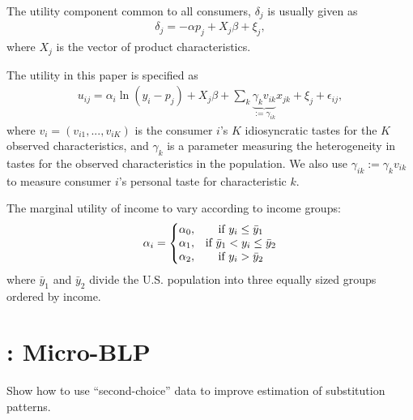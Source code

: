 \documentclass[11pt]{elegantbook}
\begin{document}
The utility component common to all consumers, $\delta_j$ is usually given as
\begin{equation}
    \begin{aligned}
        \delta_j=-\alpha p_j + X_j\beta + \xi_j,
    \end{aligned}
    \nonumber
\end{equation}
where $X_j$ is the vector of product characteristics.


The utility in this paper is specified as
\begin{equation}
    \begin{aligned}
        u_{ij}=\alpha_i\ln(y_i-p_j)+X_j\beta+\sum_{k}\underbrace{\gamma_k v_{ik}}_{:=\gamma_{ik}} x_{jk} + \xi_j + \epsilon_{ij},
    \end{aligned}
    \nonumber
\end{equation}
where $v_i=(v_{i1},...,v_{iK})$ is the consumer $i$'s $K$ idiosyncratic tastes for the $K$ observed characteristics, and $\gamma_k$ is a parameter measuring the heterogeneity in tastes for the observed characteristics in the population. We also use $\gamma_{ik}:=\gamma_{k}v_{ik}$ to measure consumer $i$'s personal taste for characteristic $k$.

The marginal utility of income to vary according to income groups:
\begin{equation}
    \begin{aligned}
        \alpha_i=\left\{\begin{matrix}
            \alpha_0,& \textnormal{if }y_i\leq\bar{y}_1\\
            \alpha_1,& \textnormal{if }\bar{y}_1< y_i\leq\bar{y}_2\\
            \alpha_2,& \textnormal{if }y_i>\bar{y}_2
        \end{matrix}\right.
    \end{aligned}
    \nonumber
\end{equation}
where $\bar{y}_1$ and $\bar{y}_2$ divide the U.S. population into three equally sized groups ordered by income.

\section{\cite{berry2004differentiated}: Micro-BLP}
Show how to use “second-choice” data to improve estimation of substitution patterns.
\end{document}
